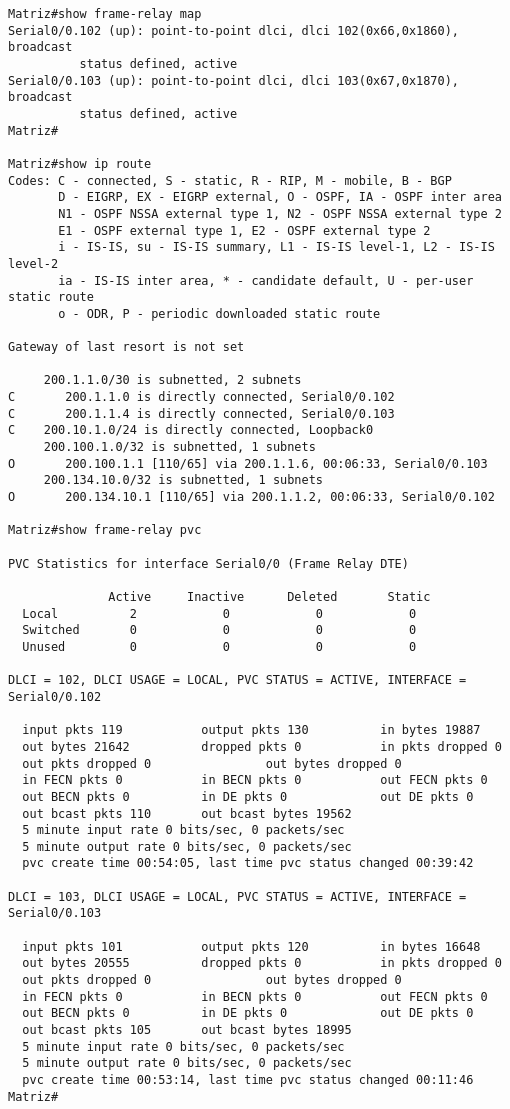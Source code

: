 \documentclass[]{article}
\begin{document}
\begin{verbatim}
Matriz#show frame-relay map
Serial0/0.102 (up): point-to-point dlci, dlci 102(0x66,0x1860), broadcast
          status defined, active
Serial0/0.103 (up): point-to-point dlci, dlci 103(0x67,0x1870), broadcast
          status defined, active
Matriz#

Matriz#show ip route
Codes: C - connected, S - static, R - RIP, M - mobile, B - BGP
       D - EIGRP, EX - EIGRP external, O - OSPF, IA - OSPF inter area
       N1 - OSPF NSSA external type 1, N2 - OSPF NSSA external type 2
       E1 - OSPF external type 1, E2 - OSPF external type 2
       i - IS-IS, su - IS-IS summary, L1 - IS-IS level-1, L2 - IS-IS level-2
       ia - IS-IS inter area, * - candidate default, U - per-user static route
       o - ODR, P - periodic downloaded static route

Gateway of last resort is not set

     200.1.1.0/30 is subnetted, 2 subnets
C       200.1.1.0 is directly connected, Serial0/0.102
C       200.1.1.4 is directly connected, Serial0/0.103
C    200.10.1.0/24 is directly connected, Loopback0
     200.100.1.0/32 is subnetted, 1 subnets
O       200.100.1.1 [110/65] via 200.1.1.6, 00:06:33, Serial0/0.103
     200.134.10.0/32 is subnetted, 1 subnets
O       200.134.10.1 [110/65] via 200.1.1.2, 00:06:33, Serial0/0.102

Matriz#show frame-relay pvc

PVC Statistics for interface Serial0/0 (Frame Relay DTE)

              Active     Inactive      Deleted       Static
  Local          2            0            0            0
  Switched       0            0            0            0
  Unused         0            0            0            0

DLCI = 102, DLCI USAGE = LOCAL, PVC STATUS = ACTIVE, INTERFACE = Serial0/0.102

  input pkts 119           output pkts 130          in bytes 19887
  out bytes 21642          dropped pkts 0           in pkts dropped 0
  out pkts dropped 0                out bytes dropped 0
  in FECN pkts 0           in BECN pkts 0           out FECN pkts 0
  out BECN pkts 0          in DE pkts 0             out DE pkts 0
  out bcast pkts 110       out bcast bytes 19562
  5 minute input rate 0 bits/sec, 0 packets/sec
  5 minute output rate 0 bits/sec, 0 packets/sec
  pvc create time 00:54:05, last time pvc status changed 00:39:42

DLCI = 103, DLCI USAGE = LOCAL, PVC STATUS = ACTIVE, INTERFACE = Serial0/0.103

  input pkts 101           output pkts 120          in bytes 16648
  out bytes 20555          dropped pkts 0           in pkts dropped 0
  out pkts dropped 0                out bytes dropped 0
  in FECN pkts 0           in BECN pkts 0           out FECN pkts 0
  out BECN pkts 0          in DE pkts 0             out DE pkts 0
  out bcast pkts 105       out bcast bytes 18995
  5 minute input rate 0 bits/sec, 0 packets/sec
  5 minute output rate 0 bits/sec, 0 packets/sec
  pvc create time 00:53:14, last time pvc status changed 00:11:46
Matriz#
\end{verbatim}
\end{document}
